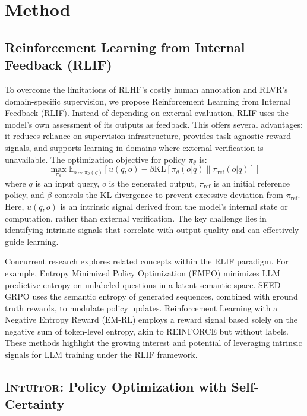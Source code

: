 \documentclass{article} %
\newcommand{\methodname}{\textsc{Intuitor}\xspace}
\begin{document}
\section{Method}

\subsection{Reinforcement Learning from Internal Feedback (RLIF)}
To overcome the limitations of RLHF's costly human annotation and RLVR's domain-specific supervision, we propose Reinforcement Learning from Internal Feedback (RLIF). Instead of depending on external evaluation, RLIF uses the model's own assessment of its outputs as feedback. This offers several advantages: it reduces reliance on supervision infrastructure, provides task-agnostic reward signals, and supports learning in domains where external verification is unavailable. The optimization objective for policy $\pi_\theta$ is:
\begin{equation}\label{eq:intuitor}
\max_{\pi_\theta} \mathbb{E}_{o \sim \pi_\theta(q)} \left[u(q, o) - \beta \mathrm{KL}[\pi_\theta(o|q) \| \pi_{\text{ref}}(o|q)] \right]
\end{equation}
where $q$ is an input query, $o$ is the generated output, $\pi_{\text{ref}}$ is an initial reference policy, and $\beta$ controls the KL divergence to prevent excessive deviation from $\pi_{\text{ref}}$. Here, $u(q,o)$ is an intrinsic signal derived from the model's internal state or computation, rather than external verification. The key challenge lies in identifying intrinsic signals that correlate with output quality and can effectively guide learning.

Concurrent research explores related concepts within the RLIF paradigm. For example, Entropy Minimized Policy Optimization (EMPO) \citep{zhang2025right} minimizes LLM predictive entropy on unlabeled questions in a latent semantic space. SEED-GRPO \citep{chen2025seed} uses the semantic entropy of generated sequences, combined with ground truth rewards, to modulate policy updates. Reinforcement Learning with a Negative Entropy Reward (EM-RL) \citep{agarwal2025unreasonable} employs a reward signal based solely on the negative sum of token-level entropy, akin to REINFORCE but without labels. These methods highlight the growing interest and potential of leveraging intrinsic signals for LLM training under the RLIF framework.

\subsection{\methodname: Policy Optimization with Self-Certainty}
\end{document}
